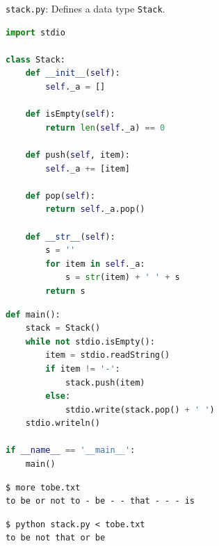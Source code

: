 \documentclass[8pt,a4paper,compress,handout]{beamer}
\begin{document}
\begin{frame}[fragile]
\begin{framed}
\tiny \lstinline{stack.py}: Defines a data type \lstinline{Stack}.
\end{framed}

\begin{lstlisting}[language=Python]
import stdio

class Stack:
    def __init__(self):
        self._a = []

    def isEmpty(self):
        return len(self._a) == 0

    def push(self, item):
        self._a += [item]

    def pop(self):
        return self._a.pop()

    def __str__(self):
        s = ''
        for item in self._a:
            s = str(item) + ' ' + s
        return s
\end{lstlisting}
\end{frame}

\begin{frame}[fragile]
\begin{lstlisting}[language=Python]
def main():
    stack = Stack()
    while not stdio.isEmpty():
        item = stdio.readString()
        if item != '-':
            stack.push(item)
        else:
            stdio.write(stack.pop() + ' ')
    stdio.writeln()

if __name__ == '__main__':
    main()
\end{lstlisting}

\begin{lstlisting}[language={}]
$ more tobe.txt
to be or not to - be - - that - - - is
\end{lstlisting}

\begin{lstlisting}[language={}]
$ python stack.py < tobe.txt 
to be not that or be
\end{lstlisting}
\end{frame}
\end{document}
